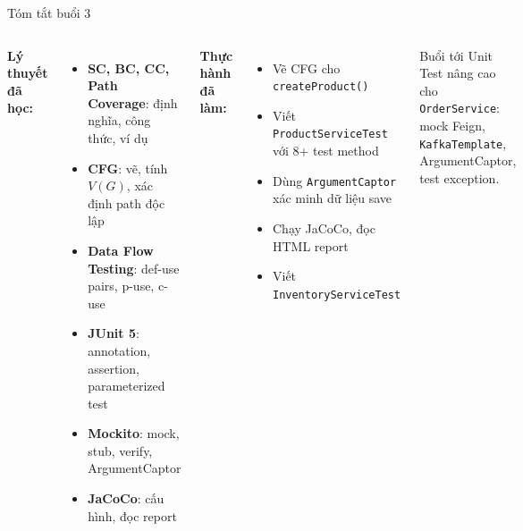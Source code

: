 \documentclass[aspectratio=169,12pt]{beamer}
\begin{document}
\begin{frame}[shrink=18]{Tóm tắt buổi 3}
  \small
  \begin{columns}[T]
    \textbf{Lý thuyết đã học:}
    \begin{itemize}
      \item \textbf{SC, BC, CC, Path Coverage}: định nghĩa, công thức, ví dụ
      \item \textbf{CFG}: vẽ, tính $V(G)$, xác định path độc lập
      \item \textbf{Data Flow Testing}: def-use pairs, p-use, c-use
      \item \textbf{JUnit 5}: annotation, assertion, parameterized test
      \item \textbf{Mockito}: mock, stub, verify, ArgumentCaptor
      \item \textbf{JaCoCo}: cấu hình, đọc report
    \end{itemize}

    \textbf{Thực hành đã làm:}
    \begin{itemize}
      \item Vẽ CFG cho \texttt{createProduct()}
      \item Viết \texttt{ProductServiceTest} với 8+ test method
      \item Dùng \texttt{ArgumentCaptor} xác minh dữ liệu save
      \item Chạy JaCoCo, đọc HTML report
      \item Viết \texttt{InventoryServiceTest}
    \end{itemize}

    \vspace{0.15em}
    \begin{block}{Buổi tới}
      Unit Test nâng cao cho \texttt{OrderService}: mock Feign,
      \texttt{KafkaTemplate}, ArgumentCaptor, test exception.
    \end{block}
  \end{columns}
\end{frame}
\end{document}
